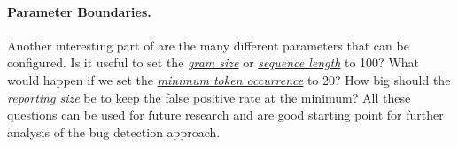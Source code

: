 \paragraph{Parameter Boundaries.}
Another interesting part of  are the many different parameters that can be configured. Is it useful to set the \hyperref[def:gram_size]{\textit{gram size}} or \hyperref[def:sequence_length]{\textit{sequence length}} to 100? What would happen if we set the \hyperref[def:minimum_token_occurrence]{\textit{minimum token occurrence}} to 20? How big should the \hyperref[def:reporting_size]{\textit{reporting size}} be to keep the false positive rate at the minimum? All these questions can be used for future research and are good starting point for further analysis of the \ngram{} bug detection approach.






 
